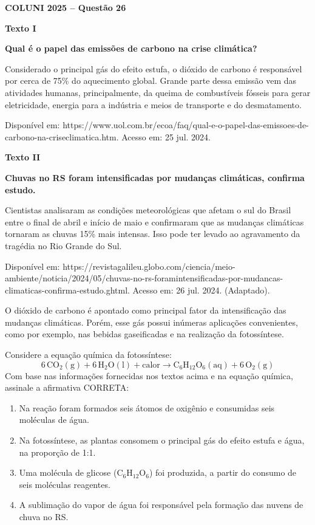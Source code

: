 \textbf{COLUNI 2025 -- Questão 26}\par\medskip \textbf{Texto I}

\textbf{Qual é o papel das emissões de carbono na crise climática?}

Considerado o principal gás do efeito estufa, o dióxido de carbono é responsável por cerca de 75\% do aquecimento global. Grande parte dessa emissão vem das atividades humanas, principalmente, da queima de combustíveis fósseis para gerar eletricidade, energia para a indústria e meios de transporte e do desmatamento.

\noindent Disponível em: https://www.uol.com.br/ecoa/faq/qual-e-o-papel-das-emissoes-de-carbono-na-criseclimatica.htm. Acesso em: 25 jul. 2024.

\textbf{Texto II}

\textbf{Chuvas no RS foram intensificadas por mudanças climáticas, confirma estudo.}

Cientistas analisaram as condições meteorológicas que afetam o sul do Brasil entre o final de abril e início de maio e confirmaram que as mudanças climáticas tornaram as chuvas 15\% mais intensas. Isso pode ter levado ao agravamento da tragédia no Rio Grande do Sul.

\noindent Disponível em: https://revistagalileu.globo.com/ciencia/meio-ambiente/noticia/2024/05/chuvas-no-rs-foramintensificadas-por-mudancas-climaticas-confirma-estudo.ghtml. Acesso em: 26 jul. 2024. (Adaptado).

O dióxido de carbono é apontado como principal fator da intensificação das mudanças climáticas. Porém, esse gás possui inúmeras aplicações convenientes, como por exemplo, nas bebidas gaseificadas e na realização da fotossíntese.

Considere a equação química da fotossíntese:
\[
6\,\mathrm{CO_2(g)}+6\,\mathrm{H_2O(l)}+\text{calor}\longrightarrow\mathrm{C_6H_{12}O_6(aq)}+6\,\mathrm{O_2(g)}
\]
Com base nas informações fornecidas nos textos acima e na equação química, assinale a afirmativa CORRETA:
\begin{enumerate}
\item Na reação foram formados seis átomos de oxigênio e consumidas seis moléculas de água.
\item Na fotossíntese, as plantas consomem o principal gás do efeito estufa e água, na proporção de 1:1.
\item Uma molécula de glicose (C$_6$H$_{12}$O$_6$) foi produzida, a partir do consumo de seis moléculas reagentes.
\item A sublimação do vapor de água foi responsável pela formação das nuvens de chuva no RS.
\end{enumerate}
